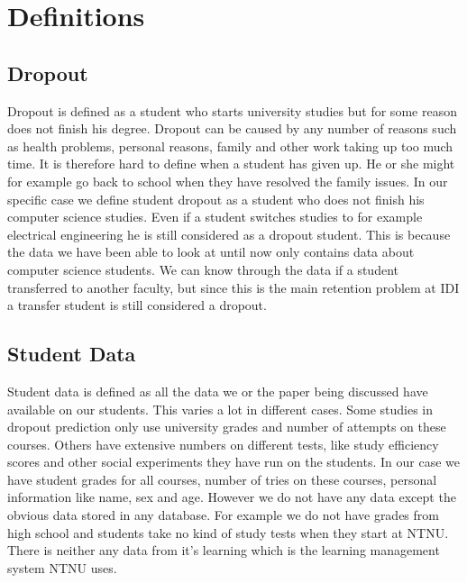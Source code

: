 \section{Definitions}
\subsection{Dropout}
Dropout is defined as a student who starts university studies but for some reason does not finish his degree. 
Dropout can be caused by any number of reasons such as health problems, personal reasons, family and other work taking up too much time.
It is therefore hard to define when a student has given up. 
He or she might for example go back to school when they have resolved the family issues.
In our specific case we define student dropout as a student who does not finish his computer science studies.
Even if a student switches studies to for example electrical engineering he is still considered as a dropout student.
This is because the data we have been able to look at until now only contains data about computer science students.
We can know through the data if a student transferred to another faculty, but since this is the main retention problem at IDI a transfer student is still considered a dropout.

\subsection{Student Data}
Student data is defined as all the data we or the paper being discussed have available on our students.
This varies a lot in different cases.
Some studies in dropout prediction only use university grades and number of attempts on these courses.
Others have extensive numbers on different tests,
like study efficiency scores and other social experiments they have run on the students. 
In our case we have student grades for all courses,
number of tries on these courses,
personal information like name, sex and age.
However we do not have any data except the obvious data stored in any database.
For example we do not have grades from high school and students take no kind of study tests when they start at NTNU.
There is neither any data from it's learning which is the learning management system NTNU uses. 

